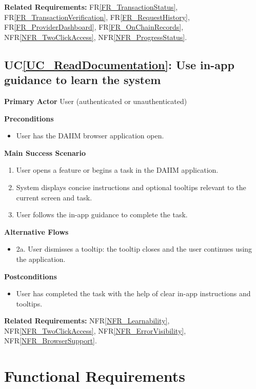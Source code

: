 \documentclass[12pt]{article}
\newcounter{ucnum} %
\newcommand{\ucref}[1]{UC\ref{#1}}
\newcommand{\rref}[1]{FR\ref{#1}}
\newcommand{\nfrref}[1]{NFR\ref{#1}}
\begin{document}
\textbf{Related Requirements:} \rref{FR_TransactionStatus}, \rref{FR_TransactionVerification}, \rref{FR_RequestHistory}, \rref{FR_ProviderDashboard}, \rref{FR_OnChainRecords}, \nfrref{NFR_TwoClickAccess}, \nfrref{NFR_ProgressStatus}.

 \label{UC_ReadDocumentation}
\subsection{\ucref{UC_ReadDocumentation}: Use in-app guidance to learn the system}

\textbf{Primary Actor}
User (authenticated or unauthenticated)

\textbf{Preconditions}
\begin{itemize}
\item User has the DAIIM browser application open.
\end{itemize}

\textbf{Main Success Scenario}
\begin{enumerate}
\item User opens a feature or begins a task in the DAIIM application.
\item System displays concise instructions and optional tooltips relevant to the current screen and task.
\item User follows the in-app guidance to complete the task.
\end{enumerate}

\textbf{Alternative Flows}
\begin{itemize}
\item 2a. User dismisses a tooltip: the tooltip closes and the user continues using the application.
\end{itemize}

\textbf{Postconditions}
\begin{itemize}
\item User has completed the task with the help of clear in-app instructions and tooltips.
\end{itemize}

\textbf{Related Requirements:} \nfrref{NFR_Learnability}, \nfrref{NFR_TwoClickAccess}, \nfrref{NFR_ErrorVisibility}, \nfrref{NFR_BrowserSupport}.

\section{Functional Requirements}
\end{document}
